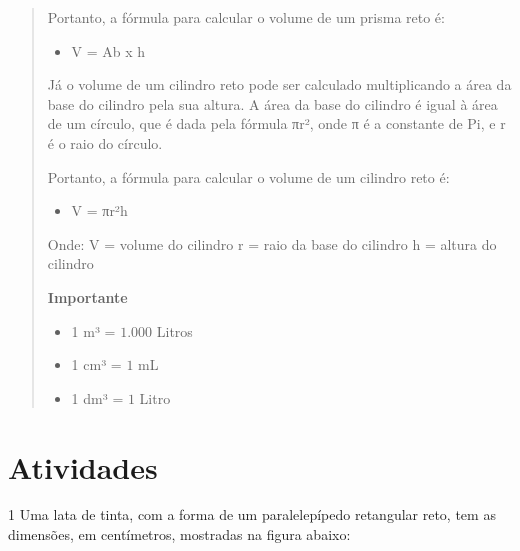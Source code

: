 
\begin{quote}
Portanto, a fórmula para calcular o volume de um prisma reto é:

\begin{itemize}
\item V = Ab x h
\end{itemize}

Já o volume de um cilindro reto pode ser calculado multiplicando a área
da base do cilindro pela sua altura. A área da base do cilindro é igual
à área de um círculo, que é dada pela fórmula πr², onde π é a constante
de Pi, e r é o raio do círculo.

Portanto, a fórmula para calcular o volume de um cilindro reto é:
\begin{itemize}
\item V = πr²h
\end{itemize}

Onde: V = volume do cilindro r = raio da base do cilindro h = altura do
cilindro

\noindent\textbf{Importante}\\
\begin{itemize}
\item 1 m³ = $1.000$ Litros
\item 1 cm³ = $1$ mL
\item 1 dm³ = $1$ Litro
\end{itemize}
\end{quote}

\section{Atividades}

\num{1}  Uma lata de tinta, com a forma de um paralelepípedo retangular reto,
tem as dimensões, em centímetros, mostradas na figura abaixo:

